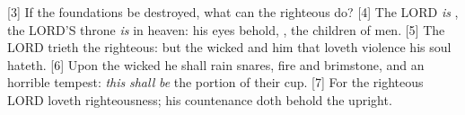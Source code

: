 [3] \textcolor[cmyk]{0.99998,1,0,0}{If the foundations be destroyed, what can the righteous do?}
[4] \textcolor[cmyk]{0.99998,1,0,0}{The LORD \emph{is} , the LORD'S throne \emph{is} in heaven: his eyes behold, , the children of men.}
[5] \textcolor[cmyk]{0.99998,1,0,0}{The LORD trieth the righteous: but the wicked and him that loveth violence his soul hateth.}
[6] \textcolor[cmyk]{0.99998,1,0,0}{Upon the wicked he shall rain snares, fire and brimstone, and an horrible tempest: \emph{this} \emph{shall} \emph{be} the portion of their cup.}
[7] \textcolor[cmyk]{0.99998,1,0,0}{For the righteous LORD loveth righteousness; his countenance doth behold the upright.}

